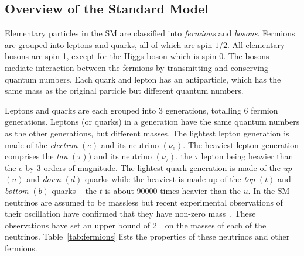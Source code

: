 \subsection{Overview of the Standard Model}
\par Elementary particles in the SM are classified into {\it fermions} 
and {\it bosons}. Fermions are grouped into leptons and quarks, all of which are  
spin-$1/2$. All elementary bosons are spin-1, except for the Higgs boson which is    
spin-0. The bosons mediate interaction between the fermions by transmitting and 
conserving quantum numbers. Each 
quark and lepton has an antiparticle, which has the same mass as the original particle 
but different quantum numbers.

\par Leptons and quarks are each grouped into 3 generations, totalling 6 
fermion generations. Leptons (or quarks) in a generation have the same quantum 
numbers as the other generations, but different masses. The lightest lepton generation 
is made of the {\it electron} $(e)$ and its neutrino $(\nu_e)$. The heaviest lepton generation 
comprises the {\it tau} $(\tau))$ and its neutrino $(\nu_\tau)$, the $\tau$ lepton 
being heavier than the $e$ by 3 orders of magnitude. The lightest quark 
generation is made of the {\it up} $(u)$ and {\it down} $(d)$ quarks  
while the heaviest is made up of the {\it top} $(t)$ and {\it bottom} $(b)$ quarks -- 
the $t$ is about 90000 times heavier than the $u$. 
In the SM neutrinos are assumed to be massless but recent experimental observations 
of their oscillation have confirmed that they have non-zero mass~\cite{Fukuda:1998mi}.
These observations have set an upper bound of 2~\eV\ on the masses of each of the 
neutrinos. Table~\ref{tab:fermions} lists the properties of these neutrinos and other fermions.   

